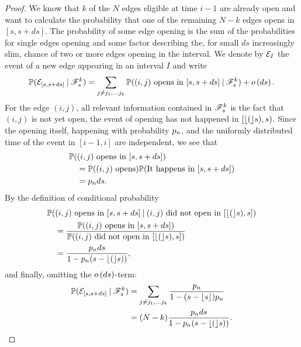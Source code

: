 \begin{proof}
	We know that $k$ of the $N$ edges eligible at time $i-1$ are already open 
	and want to calculate the probability that one of the remaining $N-k$ edges opens in $[s, s+ds]$.
	The probability of some edge opening is the sum of the probabilities for single edges opening
	and some factor describing the, for small $ds$ increasingly slim, 
	chance of two or more edges opening in the interval.
	We denote by $\mathcal{E}_{I}$ the event of a new edge appearing in an interval $I$ and write
	\begin{equation}
	\mathbb{P}(\mathcal{E}_{[s,s+ds]} \: | \: \mathscr{F}_s^k)
	= \sum_{j \neq j_1, \dots j_k} \mathbb{P}( \text{$(i,j)$ opens in $[s, s+ds]$} \: | \: \mathscr{F}_s^k ) + o\left(ds\right).
	\end{equation}
	For the edge $(i,j)$, all relevant information contained in $\mathscr{F}_s^k$ is the fact that 
	$(i,j)$ is not yet open, the event of opening has not happened in $[\lfloor(\rfloor s), s)$.
	Since the opening itself, happening with probability $p_n$,
	and the uniformly distributed time of the event in $[i-1, i]$ are independent,
	we see that
	\begin{equation}
	\begin{aligned}
	&\mathbb{P}(\text{$(i,j)$ opens in $[s, s+ds]$}) \\
	&\quad = \mathbb{P}(\text{$(i,j)$ opens})\mathbb{P}(\text{It happens in $[s, s+ds]$}) \\
	&\quad = p_n ds.
	\end{aligned}
	\end{equation}
	By the definition of conditional probability
	\begin{equation}
	\begin{aligned}
	&\mathbb{P}( \text{$(i,j)$ opens in $[s, s+ds]$} \: | \: \text{$(i,j)$ did not open in $[\lfloor(\rfloor s), s]$} ) \\
	&\quad = \frac{\mathbb{P}( \text{$(i,j)$ opens in $[s, s+ds]$})}{\mathbb{P}(\text{$(i,j)$ did not open in $[\lfloor(\rfloor s), s]$})} \\
	&\quad = \frac{p_n ds}{1-p_n(s-\lfloor(\rfloor s))},
	\end{aligned}
	\end{equation}
	and finally, omitting the $o\left(ds\right)$-term:
	\begin{equation}
	\begin{aligned}
	\Prob(\NewEdge{[s,s+ds]} \cond \SigmaAlgebra_s^k) 
	&= \sum_{j \neq j_1, \dots j_k} \ps \\
	&= (N-k) \frac{\p ds}{1-\p(s-\floor(s))}.
	\end{aligned}

\end{equation}
\end{proof}
